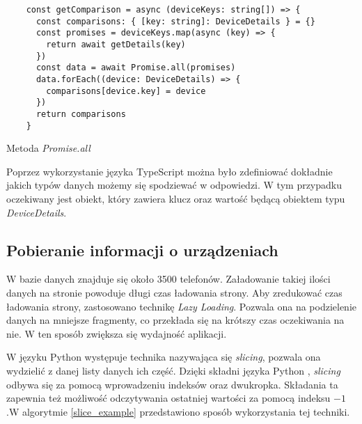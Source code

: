 \begin{code}[H]
  \begin{verbatim}
    const getComparison = async (deviceKeys: string[]) => {
      const comparisons: { [key: string]: DeviceDetails } = {}
      const promises = deviceKeys.map(async (key) => {
        return await getDetails(key)
      })
      const data = await Promise.all(promises)
      data.forEach((device: DeviceDetails) => {
        comparisons[device.key] = device
      })
      return comparisons
    }
  \end{verbatim}
  \caption{Metoda \textit{Promise.all}}
  \label{getting_devices}
\end{code}
Poprzez wykorzystanie języka TypeScript można było zdefiniować dokładnie jakich typów danych możemy się spodziewać w odpowiedzi. W tym przypadku oczekiwany jest obiekt, który zawiera klucz oraz wartość będącą obiektem typu \textit{DeviceDetails}. 

\subsection{Pobieranie informacji o urządzeniach}
W bazie danych znajduje się około 3500 telefonów. Załadowanie takiej ilości danych na stronie powoduje długi czas ładowania strony. Aby zredukować czas ładowania strony, zastosowano technikę \textit{Lazy Loading}. Pozwala ona na podzielenie danych na mniejsze fragmenty, co przekłada się na krótszy czas oczekiwania na nie. W ten sposób zwiększa się wydajność aplikacji.

W języku Python występuje technika nazywająca się \textit{slicing}, pozwala ona wydzielić z danej listy danych ich część. Dzięki składni języka Python \cite{python}, \textit{slicing} odbywa się za pomocą wprowadzeniu indeksów oraz dwukropka. Składania ta zapewnia też możliwość odczytywania ostatniej wartości za pomocą indeksu $-1$.\linebreak W algorytmie \ref{slice_example} przedstawiono sposób wykorzystania tej techniki.

